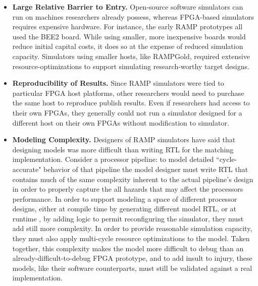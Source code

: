 \begin{itemize}
    \item \textbf{Large Relative Barrier to Entry.} Open-source software simulators can run on machines researchers already possess,
whereas FPGA-based simulators requires expensive hardware. For instance, the early RAMP prototypes all used
the BEE2 board. While using smaller, more inexpensive boards would reduce initial capital costs, it does so at the expense of reduced simulation capacity.
Simulators using smaller hosts, like RAMPGold, required extensive resource-optimizations to support simulating research-worthy target designs.

\item \textbf{Reproducibility of Results.} Since RAMP simulators were tied to particular FPGA host
platforms, other researchers would need to purchase the same host to reproduce
publish results. Even if researchers had access to their own FPGAs, they
generally could not run a simulator designed for a different host on their own
FPGAs without modification to simulator.

\item \textbf{Modeling Complexity.} Designers of RAMP simulators have said that
designing models was more difficult than writing RTL for the matching implementation.
Consider a processor pipeline: to model detailed ``cycle-accurate" behavior of that pipeline
the model designer must write RTL that contains much of the same complexity inherent to the actual pipeline's design in order
to properly capture the all hazards that may affect the processors performance.
In order to support modeling a space of different processor designs, either at compile time by generating different model RTL, or at runtime
, by adding logic to permit reconfiguring the simulator, they must add still more complexity.
In order to provide reasonable simulation capacity, they must also apply multi-cycle resource optimizations to the model.
Taken together, this complexity makes the model more difficult to debug than an already-difficult-to-debug FPGA prototype,
and to add insult to injury, these models, like their software counterparts, must still be validated against a real implementation.
\end{itemize}

%
%
%
%
%
%
%
%
%


